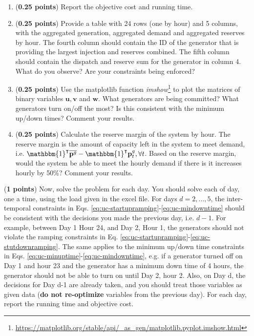 \documentclass[11pt]{exam}
\begin{document}
\begin{questions}
\begin{parts}
\begin{enumerate}
    \item (\textbf{0.25 points}) Report the objective cost and running time.
    \item (\textbf{0.25 points}) Provide a table with 24 rows (one by hour) and 5 columns, with the aggregated generation, aggregated demand and aggregated reserves by hour. The fourth column should contain the ID of the generator that is providing the largest injection and reserves combined. The fifth column should contain the dispatch and reserve sum for the generator in column 4. What do you observe? Are your constraints being enforced?
    \item (\textbf{0.25 points}) Use the matplotlib function \textit{imshow}\footnote{\url{https://matplotlib.org/stable/api/_as_gen/matplotlib.pyplot.imshow.html}} to plot the matrices of binary variables $\mathbf{u},\mathbf{v}$ and $\mathbf{w}$. What generators are being committed? What generators turn on/off the most? Is this consistent with the minimum up/down times? Comment your results. \item (\textbf{0.25 points}) Calculate the reserve margin of the system by hour. The reserve margin is the amount of capacity left in the system to meet demand, i.e. $\mathbbm{1}^\intercal\overline{\mathbf{p}^g} - \mathbbm{1}^\intercal \mathbf{p}^g_t, \forall t$. Based on the reserve margin, would the system be able to meet the hourly demand if there is it increases hourly by 50\%? Comment your results.
\end{enumerate}
\item (\textbf{1 points}) Now, solve the problem for each day. You should solve each of day, one a time, using the load given in the excel file. For days $d = 2,\dots,5$, the inter-temporal constraints in Eqs. \eqref{eq:uc-startupramping}-\eqref{eq:uc-mindowntime} should be consistent with the decisions you made the previous day, i.e. $d-1$. For example, between Day 1 Hour 24, and Day 2, Hour 1, the generators should not violate the ramping constraints in Eq. \eqref{eq:uc-startupramping}-\eqref{eq:uc-stutdownramping}. The same applies to the minimum up/down time constraints in Eqs. \eqref{eq:uc-minuptime}-\eqref{eq:uc-mindowntime}, e.g. if a generator turned off on Day 1 and hour 23 and the generator has a minimum down time of 4 hours, the generator should not be able to turn on until Day 2, hour 2. Also, on Day d, the decisions for Day d-1 are already taken, and you should treat those variables as given data (\textbf{do not re-optimize} variables from the previous day). For each day, report the running time and objective cost.


\end{parts}
\end{questions}
\end{document}

